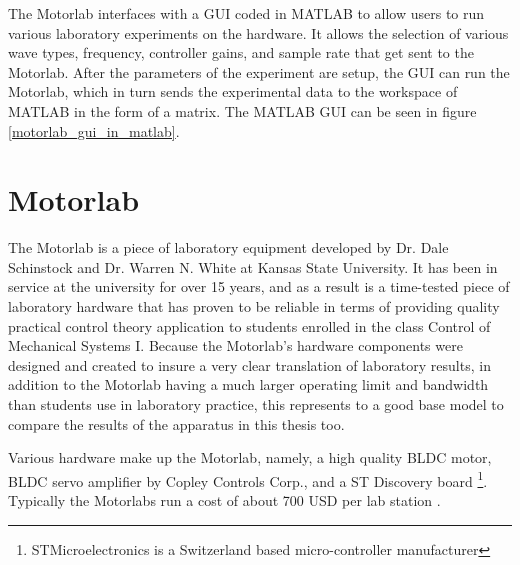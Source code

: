 The Motorlab interfaces with a \ac{GUI} coded in MATLAB to allow users to run various laboratory experiments on the hardware. It allows the selection of various wave types, frequency, controller gains, and sample rate that get sent to the Motorlab. After the parameters of the experiment are setup, the GUI can run the Motorlab, which in turn sends the experimental data to the workspace of MATLAB in the form of a matrix. The MATLAB GUI can be seen in figure \ref{motorlab_gui_in_matlab}.

\section{Motorlab}
\label{makereference2.2} 

The Motorlab is a piece of laboratory equipment developed by Dr. Dale Schinstock and Dr. Warren N. White at Kansas State University. It has been in service at the university for over 15 years, and as a result is a time-tested piece of laboratory hardware that has proven to be reliable in terms of providing quality practical control theory application to students enrolled in the class Control of Mechanical Systems I. Because the Motorlab's hardware components were designed and created to insure a very clear translation of laboratory results, in addition to the Motorlab having a much larger operating limit and bandwidth than students use in laboratory practice, this represents to a good base model to compare the results of the apparatus in this thesis too.

Various hardware make up the Motorlab, namely, a high quality BLDC motor, BLDC servo amplifier by Copley Controls Corp., and a ST Discovery board \footnote{STMicroelectronics is a Switzerland based micro-controller manufacturer}. Typically the Motorlabs run a cost of about 700 USD per lab station \citep{4}.
